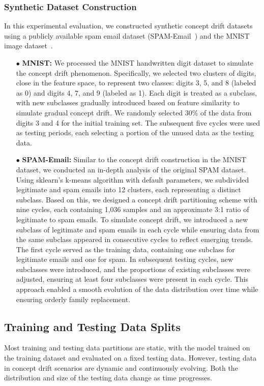 \subsubsection{Synthetic Dataset Construction}
\label{Sec: Synthetic Concept Drift Dataset Construction}
In this experimental evaluation, we constructed synthetic concept drift datasets using a publicly available spam email dataset (SPAM-Email~\cite{2010-Spam-Emali-dataset}) and the MNIST image dataset~\cite{2017-MINIST-dataset}.

\begin{itemize}[leftmargin=*]
	\item[$\bullet$] \textbf{MNIST:} 
	We processed the MNIST handwritten digit dataset to simulate the concept drift phenomenon. 
	Specifically, we selected two clusters of digits, close in the feature space, to represent two classes: digits 3, 5, and 8 (labeled as 0) and digits 4, 7, and 9 (labeled as 1).
	Each digit is treated as a subclass, with new subclasses gradually introduced based on feature similarity to simulate gradual concept drift.
	We randomly selected 30\% of the data from digits 3 and 4 for the initial training set.
	The subsequent five cycles were used as testing periods, each selecting a portion of the unused data as the testing data.
	
	\item[$\bullet$] \textbf{SPAM-Email:} 
	Similar to the concept drift construction in the MNIST dataset, we conducted an in-depth analysis of the original SPAM dataset.
	Using sklearn's k-means algorithm with default parameters, we subdivided legitimate and spam emails into 12 clusters, each representing a distinct subclass.
	Based on this, we designed a concept drift partitioning scheme with nine cycles, each containing 1,036 samples and an approximate 3:1 ratio of legitimate to spam emails.
	To simulate concept drift, we introduced a new subclass of legitimate and spam emails in each cycle while ensuring data from the same subclass appeared in consecutive cycles to reflect emerging trends.
	The first cycle served as the training data, containing one subclass for legitimate emails and one for spam. In subsequent testing cycles, new subclasses were introduced, and the proportions of existing subclasses were adjusted, ensuring at least four subclasses were present in each cycle.
	This approach enabled a smooth evolution of the data distribution over time while ensuring orderly family replacement.
\end{itemize}

\subsection{Training and Testing Data Splits}
\label{Sec: Training and Testing Data Splits}
Most training and testing data partitions are static, with the model trained on the training dataset and evaluated on a fixed testing data.
However, testing data in concept drift scenarios are dynamic and continuously evolving.
Both the distribution and size of the testing data change as time progresses.

